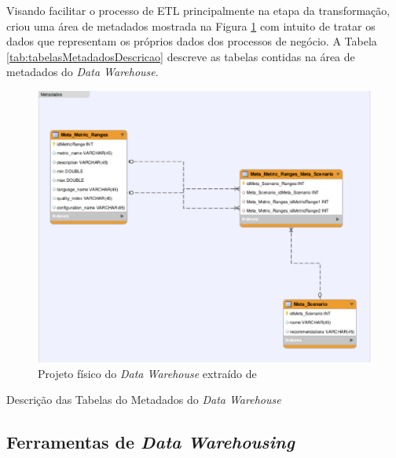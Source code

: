 Visando facilitar o processo de ETL principalmente na etapa da transformação,  criou uma área de metadados mostrada na Figura \ref{fig:metadados} com intuito de tratar os dados que representam os próprios dados dos processos de negócio. A Tabela \ref{tab:tabelasMetadadosDescricao} descreve as tabelas contidas na área de metadados do \textit{Data Warehouse}.

\begin{figure}[h!]
\centering
\includegraphics[keepaspectratio=false,scale=0.6]{figuras/figuras_nilton/metadados-baufaker.eps}
\caption{Projeto físico do \textit{Data Warehouse} extraído de }
\label{fig:metadados}
\end{figure}
\FloatBarrier

\begin{table}[!ht]
	\begin{center}
	
	 
	\caption{Descrição das Tabelas do Metadados do \textit{Data Warehouse} }
	\label{tab:tabelasMetadadosDescricao}
	\end{center}
	\end{table}	
	\FloatBarrier

\subsection{Ferramentas de \textit{Data Warehousing}}
\label{ferramentas}

